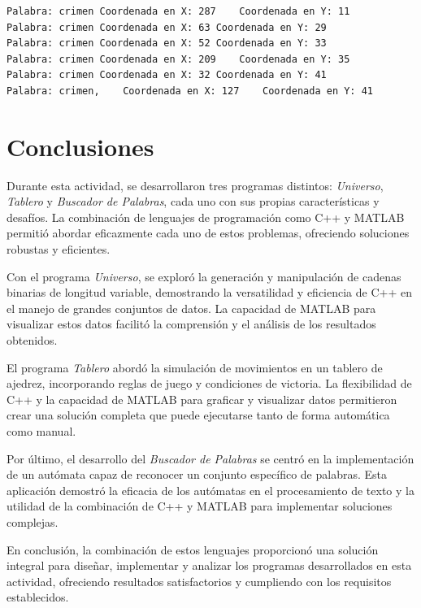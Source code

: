 \documentclass{article}
\begin{document}
    \begin{lstlisting}[language={},basicstyle=\ttfamily\footnotesize, breaklines=true]
Palabra: crimen	Coordenada en X: 287	Coordenada en Y: 11
Palabra: crimen	Coordenada en X: 63	Coordenada en Y: 29
Palabra: crimen	Coordenada en X: 52	Coordenada en Y: 33
Palabra: crimen	Coordenada en X: 209	Coordenada en Y: 35
Palabra: crimen	Coordenada en X: 32	Coordenada en Y: 41
Palabra: crimen,	Coordenada en X: 127	Coordenada en Y: 41
    \end{lstlisting}
\newpage
\section{Conclusiones}
Durante esta actividad, se desarrollaron tres programas distintos: \textit{Universo}, \textit{Tablero} y \textit{Buscador de Palabras},
cada uno con sus propias características y desafíos. La combinación de lenguajes de programación como C++ y MATLAB permitió abordar
eficazmente cada uno de estos problemas, ofreciendo soluciones robustas y eficientes.

Con el programa \textit{Universo}, se exploró la generación y manipulación de cadenas binarias de longitud variable, demostrando la
versatilidad y eficiencia de C++ en el manejo de grandes conjuntos de datos. La capacidad de MATLAB para visualizar estos datos
facilitó la comprensión y el análisis de los resultados obtenidos.

El programa \textit{Tablero} abordó la simulación de movimientos en un tablero de ajedrez, incorporando reglas de juego y condiciones
de victoria. La flexibilidad de C++ y la capacidad de MATLAB para graficar y visualizar datos permitieron crear una solución completa
que puede ejecutarse tanto de forma automática como manual.

Por último, el desarrollo del \textit{Buscador de Palabras} se centró en la implementación de un autómata capaz de reconocer un
conjunto específico de palabras. Esta aplicación demostró la eficacia de los autómatas en el procesamiento de texto y la utilidad de
la combinación de C++ y MATLAB para implementar soluciones complejas.

En conclusión, la combinación de estos lenguajes proporcionó una solución integral para diseñar, implementar y analizar los programas
desarrollados en esta actividad, ofreciendo resultados satisfactorios y cumpliendo con los requisitos establecidos.


\newpage

\end{document}
